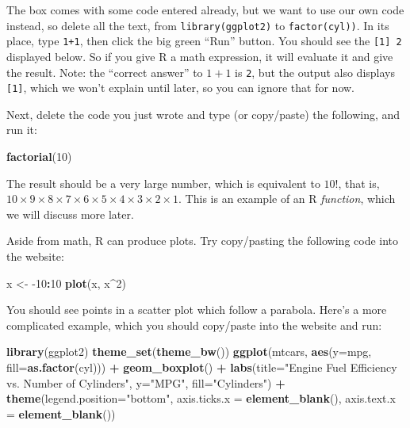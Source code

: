 \documentclass[
]{article}
\newenvironment{Shaded}{\begin{snugshade}}{\end{snugshade}}
\newcommand{\DataTypeTok}[1]{\textcolor[rgb]{0.13,0.29,0.53}{#1}}
\newcommand{\DecValTok}[1]{\textcolor[rgb]{0.00,0.00,0.81}{#1}}
\newcommand{\KeywordTok}[1]{\textcolor[rgb]{0.13,0.29,0.53}{\textbf{#1}}}
\newcommand{\NormalTok}[1]{#1}
\newcommand{\OperatorTok}[1]{\textcolor[rgb]{0.81,0.36,0.00}{\textbf{#1}}}
\newcommand{\StringTok}[1]{\textcolor[rgb]{0.31,0.60,0.02}{#1}}
\begin{document}
The box comes with some code entered already, but we want to use our own code instead, so delete all the text, from \texttt{library(ggplot2)} to \texttt{factor(cyl))}.
In its place, type \texttt{1+1}, then click the big green ``Run'' button.
You should see the \texttt{{[}1{]}\ 2} displayed below.
So if you give R a math expression, it will evaluate it and give the result.
Note: the ``correct answer'' to \(1+1\) is \texttt{2}, but the output also displays \texttt{{[}1{]}}, which we won't explain until later, so you can ignore that for now.

Next, delete the code you just wrote and type (or copy/paste) the following, and run it:

\begin{Shaded}
\begin{Highlighting}[]
\KeywordTok{factorial}\NormalTok{(}\DecValTok{10}\NormalTok{)}
\end{Highlighting}
\end{Shaded}

The result should be a very large number, which is equivalent to \(10!\), that is, \(10\times9\times8\times7\times6\times5\times4\times3\times2\times1\).
This is an example of an R \emph{function}, which we will discuss more later.

Aside from math, R can produce plots. Try copy/pasting the following code into the website:

\begin{Shaded}
\begin{Highlighting}[]
\NormalTok{x <-}\StringTok{ }\DecValTok{-10}\OperatorTok{:}\DecValTok{10}
\KeywordTok{plot}\NormalTok{(x, x}\OperatorTok{^}\DecValTok{2}\NormalTok{)}
\end{Highlighting}
\end{Shaded}

You should see points in a scatter plot which follow a parabola.
Here's a more complicated example, which you should copy/paste into the website and run:

\begin{Shaded}
\begin{Highlighting}[]
\KeywordTok{library}\NormalTok{(ggplot2)}
\KeywordTok{theme_set}\NormalTok{(}\KeywordTok{theme_bw}\NormalTok{())}
\KeywordTok{ggplot}\NormalTok{(mtcars, }\KeywordTok{aes}\NormalTok{(}\DataTypeTok{y=}\NormalTok{mpg, }\DataTypeTok{fill=}\KeywordTok{as.factor}\NormalTok{(cyl))) }\OperatorTok{+}\StringTok{ }
\StringTok{  }\KeywordTok{geom_boxplot}\NormalTok{() }\OperatorTok{+}\StringTok{ }
\StringTok{  }\KeywordTok{labs}\NormalTok{(}\DataTypeTok{title=}\StringTok{"Engine Fuel Efficiency vs. Number of Cylinders"}\NormalTok{, }\DataTypeTok{y=}\StringTok{"MPG"}\NormalTok{, }\DataTypeTok{fill=}\StringTok{"Cylinders"}\NormalTok{) }\OperatorTok{+}\StringTok{ }
\StringTok{  }\KeywordTok{theme}\NormalTok{(}\DataTypeTok{legend.position=}\StringTok{"bottom"}\NormalTok{, }
        \DataTypeTok{axis.ticks.x =} \KeywordTok{element_blank}\NormalTok{(),}
        \DataTypeTok{axis.text.x =} \KeywordTok{element_blank}\NormalTok{())}
\end{Highlighting}
\end{Shaded}
\end{document}
